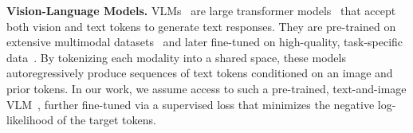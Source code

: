 

\textbf{Vision-Language Models.}  
VLMs~\citep{vila2024, liu2024visual} are large transformer models~\citep{vaswani2023attentionneed} that accept both vision and text tokens to generate text responses. They are pre-trained on extensive multimodal datasets~\citep{zhu2023multimodal,kakaobrain2022coyo-700m} and later fine-tuned on high-quality, task-specific data~\citep{Shen2021IncorporatingVL,lu2022learn}. By tokenizing each modality into a shared space, these models autoregressively produce sequences of text tokens conditioned on an image and prior tokens. In our work, we assume access to such a pre-trained, text-and-image VLM~\citep{vila2024, liu2024visual}, further fine-tuned via a supervised loss that minimizes the negative log-likelihood of the target tokens.


